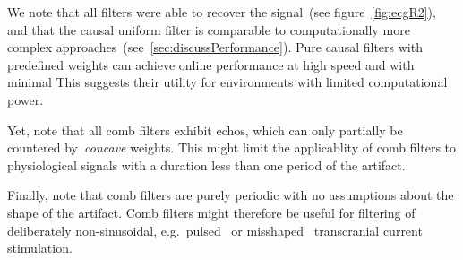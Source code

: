 \documentclass[a4paper]{article}
\newcommand{\figref}[1]{(see figure~\ref{#1})}
\newcommand{\secref}[1]{(see~\ref{#1})}
\begin{document}
We note that all filters were able to recover the signal~\figref{fig:ecgR2}, and that the causal uniform filter is comparable to computationally more complex approaches~\secref{sec:discussPerformance}. Pure causal filters with predefined weights can achieve online performance at high speed and with minimal This suggests their utility for environments with limited computational power.

Yet, note that all comb filters exhibit echos, which  can only partially be countered by~\emph{concave} weights. This might limit the applicablity of comb filters to physiological signals with a duration less than one period of the artifact.

Finally, note that comb filters are purely periodic with no assumptions about the shape of the artifact. Comb filters might therefore be useful for filtering of deliberately non-sinusoidal, e.g.\ pulsed~\citep{Jaberzadeh_2015} or misshaped~\citep{Cole_2017} transcranial current stimulation.



\end{document}
